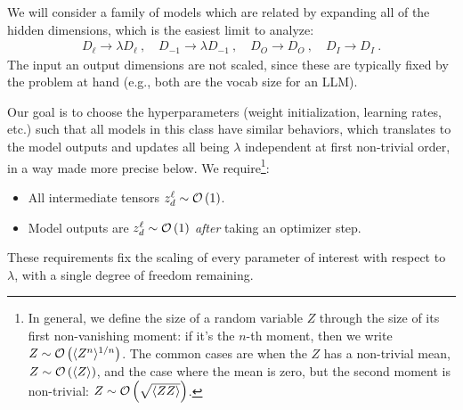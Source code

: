 We will consider a family of models which are related by expanding all of the hidden dimensions, which is
the easiest limit to analyze:
\begin{align}
    D _{\ell } \longrightarrow   \lambda D _{ \ell }\ ,\quad D _{-1 } \longrightarrow   \lambda D _{-1}\ ,\quad D _{O } \longrightarrow   D _{O}\ ,\quad
    D _{I} \longrightarrow   D _{I}\ . \label{app_eq_mup_width_scaling}
\end{align}
The input an output dimensions are not scaled, since these are typically fixed by the problem at
hand (e.g., both are the vocab size for an LLM).

Our goal is to choose the hyperparameters (weight initialization, learning rates, etc.) such that
all models in this class have similar behaviors, which translates to the model outputs and updates
all being $ \lambda  $ independent at first non-trivial order, in a way made more precise below. We
require\footnote{In general, we define the size of a random variable $ Z $ through the size of its first
non-vanishing moment: if it's the $ n $-th moment, then we write $ Z \sim \mathcal{O} \left( \langle Z^{ n
} \rangle^{1/n} \right)$. The common cases are when the $ Z $ has a non-trivial mean,  $ Z \sim
\mathcal{O} \left( \langle Z \rangle \right)$, and the case where the mean is zero, but the second moment
is non-trivial: $ Z \sim \mathcal{O} \left( \sqrt{\langle Z Z \rangle} \right)$.}:
\begin{itemize}
    \item All intermediate tensors $ z ^{ \ell }  _{d  } \sim \mathcal{O} \left( 1 \right)  $.
    \item Model outputs are $ z ^{ \ell } _{ d } \sim \mathcal{O} \left( 1 \right)  $ \textit{after}
        taking an optimizer step.
\end{itemize}
 These requirements fix the scaling of every parameter of interest with respect
to $ \lambda  $, with a single degree of freedom remaining.

